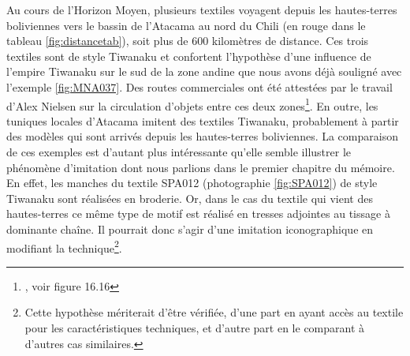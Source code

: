 Au cours de l'Horizon Moyen, plusieurs textiles voyagent depuis les hautes-terres boliviennes vers le bassin de l'Atacama au nord du Chili (en rouge dans le tableau \ref{fig:distancetab}), soit plus de 600 kilomètres de distance. Ces trois textiles sont de style Tiwanaku et confortent l'hypothèse d'une influence de l'empire Tiwanaku sur le sud de la zone andine que nous avons déjà souligné avec l'exemple \ref{fig:MNA037}. Des routes commerciales ont été attestées par le travail d'Alex Nielsen sur la circulation d'objets entre ces deux zones\footnote{\cite[p.~407]{nielsenCirculatingObjectsConstitution2013}, voir figure 16.16}. En outre, les tuniques locales d'Atacama imitent des textiles Tiwanaku, probablement à partir des modèles qui sont arrivés depuis les hautes-terres boliviennes. La comparaison de ces exemples est d'autant plus intéressante qu'elle semble illustrer le phénomène d'imitation dont nous parlions dans le premier chapitre du mémoire. En effet, les manches du textile SPA012 (photographie \ref{fig:SPA012}) de style Tiwanaku sont réalisées en broderie. Or, dans le cas du textile qui vient des hautes-terres ce même type de motif est réalisé en tresses adjointes au tissage à dominante chaîne. %
Il pourrait donc s'agir d'une imitation iconographique en modifiant la technique\footnote{Cette hypothèse mériterait d'être vérifiée, d'une part en ayant accès au textile pour les caractéristiques techniques, et d'autre part en le comparant à d'autres cas similaires.}.

